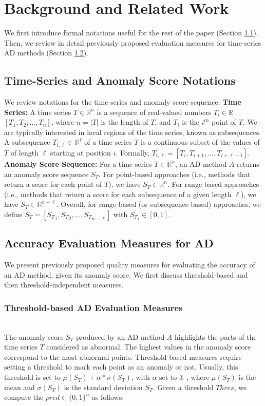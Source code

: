 \section{Background and Related Work}
\label{sec:background}

We first introduce formal notations useful for the rest of the paper (Section \ref{sec:notation}). Then, we review in detail previously proposed evaluation measures for time-series AD methods (Section \ref{acc_measure}). 


\subsection{Time-Series and Anomaly Score Notations}
\label{sec:notation}
We review notations for the time series and anomaly score sequence.
\newline \textbf{Time Series: } A time series $T \in \mathbb{R}^n $ is a sequence of real-valued numbers $T_i\in\mathbb{R}$ $[T_1,T_2,...,T_n]$, where $n=|T|$ is the length of $T$, and $T_i$ is the $i^{th}$ point of $T$. We are typically interested in local regions of the time series, known as subsequences. A subsequence $T_{i,\ell} \in \mathbb{R}^\ell$ of a time series $T$ is a continuous subset of the values of $T$ of length $\ell$ starting at position $i$. Formally, $T_{i,\ell} = [T_i, T_{i+1},...,T_{i+\ell-1}]$.	
\newline \textbf{Anomaly Score Sequence: } For a time series $T \in \mathbb{R}^n $, an AD method $A$ returns an anomaly score sequence $S_T$. For point-based approaches (i.e., methods that return a score for each point of $T$), we have $S_T \in \mathbb{R}^n$. For range-based approaches (i.e., methods that return a score for each subsequence of a given length $\ell$), we have $S_T \in \mathbb{R}^{n-\ell}$. Overall, for range-based (or subsequence-based) approaches, we define $S_T = [{S_T}_1,{S_T}_2,...,{S_T}_{n-\ell}]$ with ${S_T}_i \in [0,1]$.


\subsection{Accuracy Evaluation Measures for AD}
\label{acc_measure}

We present previously proposed quality measures for evaluating the accuracy of an AD method, given its anomaly score. We first discuss threshold-based and then threshold-independent measures.

\subsubsection{Threshold-based AD Evaluation Measures} \hfill\\
The anomaly score $S_T$ produced by an AD method $A$ highlights the parts of the time series $T$ considered as abnormal. The highest values in the anomaly score correspond to the most abnormal points. Threshold-based measures require setting a threshold to mark each point as an anomaly or not. Usually, this threshold is set to $\mu(S_T) + \alpha*\sigma(S_T)$, with $\alpha$ set to 3~\cite{statisticaloutliers}, where $\mu(S_T)$ is the mean and $\sigma(S_T)$ is the standard deviation $S_T$. Given a threshold $Thres$, we compute the $pred \in \{0,1\}^n$ as follows:


